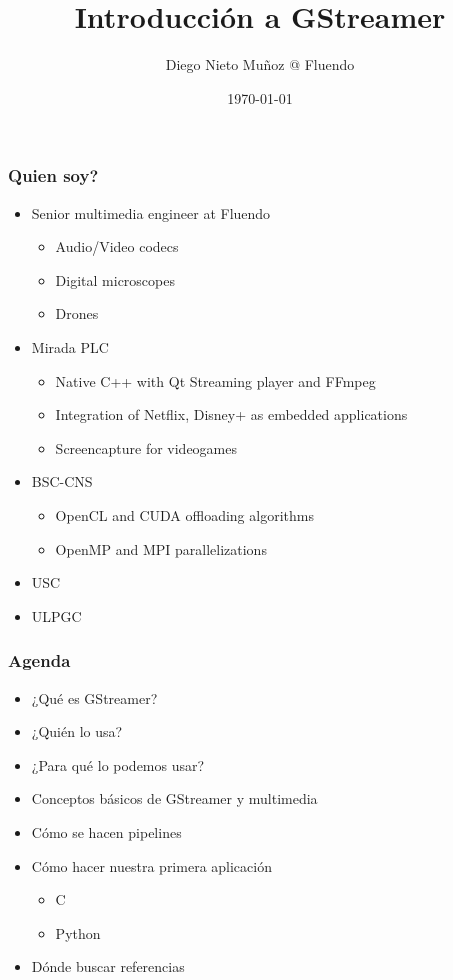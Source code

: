 \documentclass{beamer}
\title{Introducción a GStreamer}
\author{Diego Nieto Muñoz @ Fluendo}
\date{\today}
\begin{document}
\begin{frame}
  \titlepage
\end{frame}

\begin{frame}
  \frametitle{Quien soy?}
  \begin{itemize}
    \item Senior multimedia engineer at Fluendo
    \begin{itemize}
      \item Audio/Video codecs
      \item Digital microscopes
      \item Drones
    \end{itemize}
    \item Mirada PLC
    \begin{itemize}
      \item Native C++ with Qt Streaming player and FFmpeg
      \item Integration of Netflix, Disney+ as embedded applications
      \item Screencapture for videogames
    \end{itemize}
    \item BSC-CNS
    \begin{itemize}
      \item OpenCL and CUDA offloading algorithms
      \item OpenMP and MPI parallelizations
    \end{itemize}
    \item USC
    \item ULPGC
  \end{itemize}
\end{frame}

\begin{frame}
  \frametitle{Agenda}
  \begin{itemize}
    \item ¿Qué es GStreamer?
    \item ¿Quién lo usa?
    \item ¿Para qué lo podemos usar?
    \item Conceptos básicos de GStreamer y multimedia
    \item Cómo se hacen pipelines
    \item Cómo hacer nuestra primera aplicación
    \begin{itemize}
      \item C
      \item Python
    \end{itemize}
    \item Dónde buscar referencias
  \end{itemize}
\end{frame}
\end{document}
